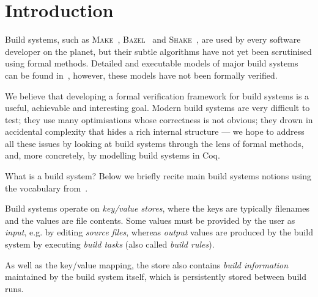 \documentclass[sigplan]{acmart}\settopmatter{printfolios=true,printccs=false,printacmref=false}
\newcommand{\Bazel}{\textsc{Bazel}\xspace}
\newcommand{\Make}{\textsc{Make}\xspace}
\newcommand{\Shake}{\textsc{Shake}\xspace}
\begin{document}
\maketitle

\vspace{-3mm}
\section{Introduction}
\vspace{-1mm}

Build systems, such as \Make~\cite{feldman1979make},
\Bazel~\cite{bazel} and \Shake~\cite{mitchell2012shake}, are used by every
software developer on the planet, but their subtle algorithms have not yet been
scrutinised using formal methods. Detailed and executable models of major build
systems can be found in~\cite{Mokhov2018icfp}, however, these models have not
been formally verified.

We believe that developing a formal verification framework for build systems
is a useful, achievable and interesting goal. Modern build systems are
very difficult to test; they use many optimisations whose correctness is not
obvious; they drown in accidental complexity that hides a rich internal
structure --- we hope to address all these issues by looking at build systems
through the lens of formal methods, and, more concretely, by modelling build
systems in Coq.

What is a build system? Below we briefly recite main build systems notions
using the vocabulary from~\cite{Mokhov2018icfp}.

Build systems operate on \emph{key/value stores}, where the keys are typically
filenames and the values are file contents. Some values must be provided by
the user as \emph{input}, e.g. by editing \emph{source files}, whereas
\emph{output} values are produced by the build system by executing \emph{build
tasks} (also called \emph{build rules}).

As well as the key/value mapping, the store also contains \emph{build
information} maintained by the build system itself, which is persistently stored
between build runs.
\end{document}
